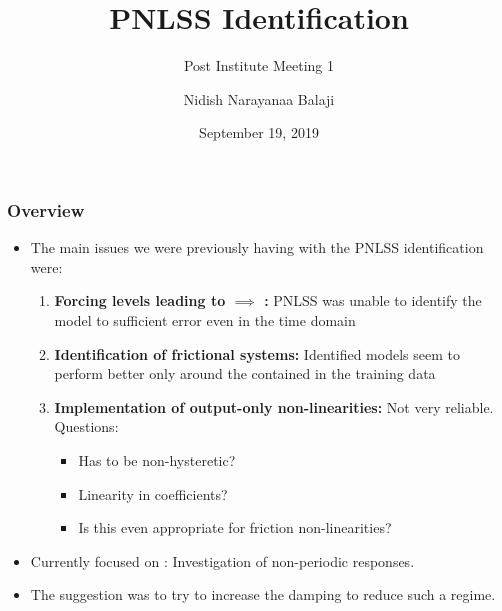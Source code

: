 \documentclass[aspectratio=169]{beamer}
\title{PNLSS Identification}
\subtitle{Post Institute Meeting 1}
\author[Balaji, N. N.]{Nidish Narayanaa Balaji}
\institute[Rice U.]{Rice University, Houston, TX 77005}
\date{September 19, 2019}
\begin{document}
\maketitle{}

\begin{frame}
  \frametitle{Overview}
  \begin{itemize}
  \item The main issues we were previously having with the PNLSS
    identification were:
    \begin{enumerate}
    \item \textbf{Forcing levels leading to 
      $\implies$ :} PNLSS was unable to
      identify the model to sufficient error even in the time domain
    \item \textbf{Identification of frictional systems:} Identified models seem
      to perform better only around the  contained
      in the training data
    \item \textbf{Implementation of output-only non-linearities:} Not
      very reliable. Questions:
      \begin{itemize}
      \item Has to be non-hysteretic?
      \item Linearity in coefficients? 
      \item Is this even appropriate for friction non-linearities?
      \end{itemize}
    \end{enumerate}
  \item Currently focused on : Investigation of
    non-periodic responses.
  \item The suggestion was to try to increase the damping to reduce
    such a regime.
\end{itemize}
\end{frame}
\end{document}
